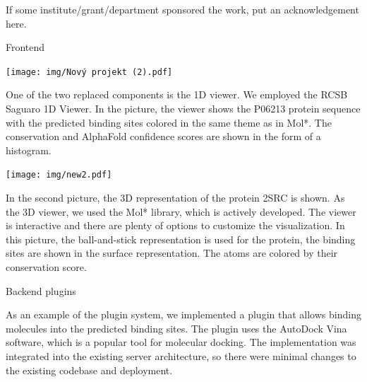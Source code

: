 \documentclass[portrait,a0paper,fontscale=0.25]{baposter}
\begin{document}
\begin{poster}
%
%

\begin{posterbox}[column=0, span=2, name=footer, below=tech,
	textborder=none, headerborder=none, boxheaderheight=0pt,
	boxColorOne=black!3]{}
If some institute/grant/department sponsored the work, put an acknowledgement here.
\end{posterbox}

%
%
%

\begin{posterbox}[column=1, name=result1]{Frontend}
\begin{center}
	\texttt{[image: img/Nový projekt (2).pdf]}
\end{center}

One of the two replaced components is the 1D viewer. We employed the RCSB Saguaro 1D Viewer.
In the picture, the viewer shows the P06213 protein sequence with the predicted binding sites colored in the same theme as in Mol*.
The conservation and AlphaFold confidence scores are shown in the form of a histogram.

\begin{center}
	\texttt{[image: img/new2.pdf]}
\end{center}

In the second picture, the 3D representation of the protein 2SRC is shown.
As the 3D viewer, we used the Mol* library, which is actively developed.
The viewer is interactive and there are plenty of options to customize the visualization.
In this picture, the ball-and-stick representation is used for the protein, the binding sites are shown in the surface representation.
The atoms are colored by their conservation score.

\end{posterbox}

\begin{posterbox}[column=1, name=result2, below=result1]{Backend plugins}

As an example of the plugin system, we implemented a plugin that allows binding molecules into the predicted binding sites.
The plugin uses the AutoDock Vina software, which is a popular tool for molecular docking.
The implementation was integrated into the existing server architecture, so there were minimal changes to the existing codebase and deployment.


\end{posterbox}
\end{poster}
\end{document}
